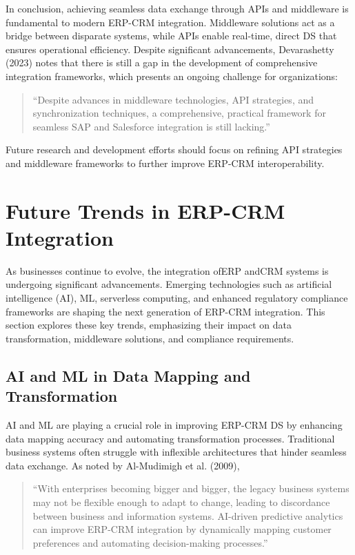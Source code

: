 In conclusion, achieving seamless data exchange through APIs and middleware is fundamental to modern ERP-CRM integration. Middleware solutions act as a bridge between disparate systems, while APIs enable real-time, direct DS that ensures operational efficiency. Despite significant advancements, Devarashetty (2023) notes that there is still a gap in the development of comprehensive integration frameworks, which presents an ongoing challenge for organizations:
\begin{quote}
    ``Despite advances in middleware technologies, API strategies, and synchronization techniques, a comprehensive, practical framework for seamless SAP and Salesforce integration is still lacking.'' \cite{devarashetty2023}
\end{quote}
Future research and development efforts should focus on refining API strategies and middleware frameworks to further improve ERP-CRM interoperability.


\section{Future Trends in ERP-CRM Integration}

As businesses continue to evolve, the integration ofERP andCRM systems is undergoing significant advancements. Emerging technologies such as artificial intelligence (AI), ML, serverless computing, and enhanced regulatory compliance frameworks are shaping the next generation of ERP-CRM integration. This section explores these key trends, emphasizing their impact on data transformation, middleware solutions, and compliance requirements.

\subsection{AI and ML in Data Mapping and Transformation}

AI and ML are playing a crucial role in improving ERP-CRM DS by enhancing data mapping accuracy and automating transformation processes. Traditional business systems often struggle with inflexible architectures that hinder seamless data exchange. As noted by Al-Mudimigh et al. (2009), 
\begin{quote}
    ``With enterprises becoming bigger and bigger, the legacy business systems may not be flexible enough to adapt to change, leading to discordance between business and information systems. AI-driven predictive analytics can improve ERP-CRM integration by dynamically mapping customer preferences and automating decision-making processes.'' \cite{almudimigh2009}
\end{quote}

